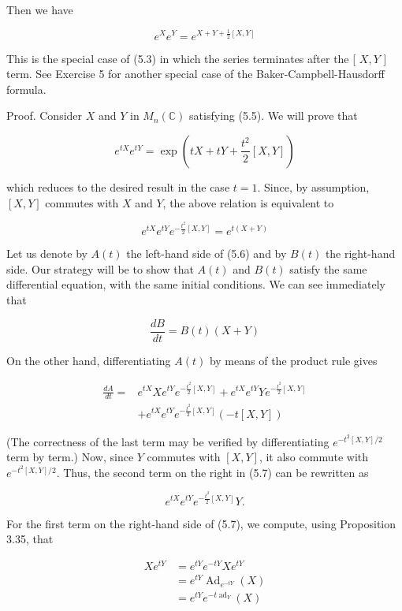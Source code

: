 \documentclass[10pt, letterpaper]{article}
\begin{document}
Then we have

$$
e^{X} e^{Y}=e^{X+Y+\frac{1}{2}[X, Y]}
$$

This is the special case of (5.3) in which the series terminates after the [ $X, Y$ ] term. See Exercise 5 for another special case of the Baker-Campbell-Hausdorff formula.

Proof. Consider $X$ and $Y$ in $M_{n}(\mathbb{C})$ satisfying (5.5). We will prove that

$$
e^{t X} e^{t Y}=\exp \left(t X+t Y+\frac{t^{2}}{2}[X, Y]\right)
$$

which reduces to the desired result in the case $t=1$. Since, by assumption, $[X, Y]$ commutes with $X$ and $Y$, the above relation is equivalent to

$$
e^{t X} e^{t Y} e^{-\frac{t^{2}}{2}[X, Y]}=e^{t(X+Y)}
$$

Let us denote by $A(t)$ the left-hand side of (5.6) and by $B(t)$ the right-hand side. Our strategy will be to show that $A(t)$ and $B(t)$ satisfy the same differential equation, with the same initial conditions. We can see immediately that

$$
\frac{d B}{d t}=B(t)(X+Y)
$$

On the other hand, differentiating $A(t)$ by means of the product rule gives

$$
\begin{aligned}
\frac{d A}{d t}= & e^{t X} X e^{t Y} e^{-\frac{t^{2}}{2}[X, Y]}+e^{t X} e^{t Y} Y e^{-\frac{t^{2}}{2}[X, Y]} \\
& +e^{t X} e^{t Y} e^{-\frac{t^{2}}{2}[X, Y]}(-t[X, Y])
\end{aligned}
$$

(The correctness of the last term may be verified by differentiating $e^{-t^{2}[X, Y] / 2}$ term by term.) Now, since $Y$ commutes with $[X, Y]$, it also commute with $e^{-t^{2}[X, Y] / 2}$. Thus, the second term on the right in (5.7) can be rewritten as

$$
e^{t X} e^{t Y} e^{-\frac{t^{2}}{2}[X, Y]} Y .
$$

For the first term on the right-hand side of (5.7), we compute, using Proposition 3.35, that

$$
\begin{aligned}
X e^{t Y} & =e^{t Y} e^{-t Y} X e^{t Y} \\
& =e^{t Y} \operatorname{Ad}_{e^{-t Y}}(X) \\
& =e^{t Y} e^{-t \operatorname{ad}_{Y}}(X)
\end{aligned}
$$
\end{document}
